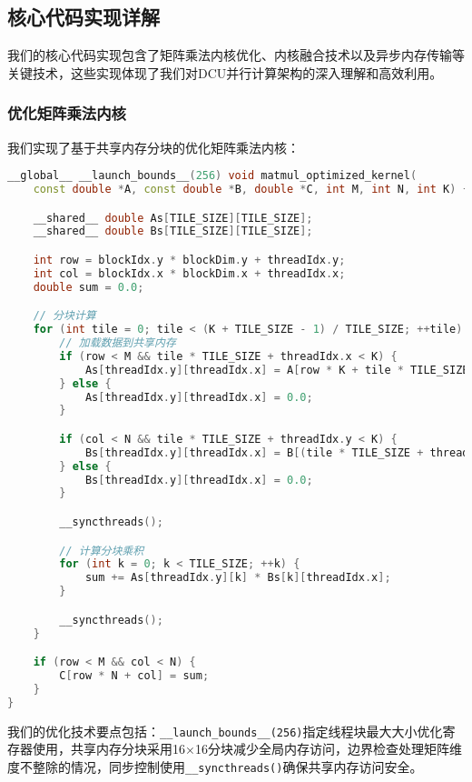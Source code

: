 \documentclass[12pt,a4paper]{article}
\begin{document}
\subsection{核心代码实现详解}

我们的核心代码实现包含了矩阵乘法内核优化、内核融合技术以及异步内存传输等关键技术，这些实现体现了我们对DCU并行计算架构的深入理解和高效利用。

\subsubsection{优化矩阵乘法内核}

我们实现了基于共享内存分块的优化矩阵乘法内核：

\begin{lstlisting}[language=c++,caption=优化矩阵乘法内核实现]
__global__ __launch_bounds__(256) void matmul_optimized_kernel(
    const double *A, const double *B, double *C, int M, int N, int K) {

    __shared__ double As[TILE_SIZE][TILE_SIZE];
    __shared__ double Bs[TILE_SIZE][TILE_SIZE];

    int row = blockIdx.y * blockDim.y + threadIdx.y;
    int col = blockIdx.x * blockDim.x + threadIdx.x;
    double sum = 0.0;

    // 分块计算
    for (int tile = 0; tile < (K + TILE_SIZE - 1) / TILE_SIZE; ++tile) {
        // 加载数据到共享内存
        if (row < M && tile * TILE_SIZE + threadIdx.x < K) {
            As[threadIdx.y][threadIdx.x] = A[row * K + tile * TILE_SIZE + threadIdx.x];
        } else {
            As[threadIdx.y][threadIdx.x] = 0.0;
        }

        if (col < N && tile * TILE_SIZE + threadIdx.y < K) {
            Bs[threadIdx.y][threadIdx.x] = B[(tile * TILE_SIZE + threadIdx.y) * N + col];
        } else {
            Bs[threadIdx.y][threadIdx.x] = 0.0;
        }

        __syncthreads();

        // 计算分块乘积
        for (int k = 0; k < TILE_SIZE; ++k) {
            sum += As[threadIdx.y][k] * Bs[k][threadIdx.x];
        }

        __syncthreads();
    }

    if (row < M && col < N) {
        C[row * N + col] = sum;
    }
}
\end{lstlisting}

我们的优化技术要点包括：\texttt{\_\_launch\_bounds\_\_(256)}指定线程块最大大小优化寄存器使用，共享内存分块采用16×16分块减少全局内存访问，边界检查处理矩阵维度不整除的情况，同步控制使用\texttt{\_\_syncthreads()}确保共享内存访问安全。
\end{document}

